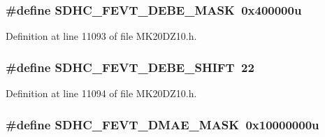 \subsubsection[{\texorpdfstring{S\+D\+H\+C\+\_\+\+F\+E\+V\+T\+\_\+\+D\+E\+B\+E\+\_\+\+M\+A\+SK}{SDHC_FEVT_DEBE_MASK}}]{\setlength{\rightskip}{0pt plus 5cm}\#define S\+D\+H\+C\+\_\+\+F\+E\+V\+T\+\_\+\+D\+E\+B\+E\+\_\+\+M\+A\+SK~0x400000u}\hypertarget{group___s_d_h_c___register___masks_gac409de67d8fb1f25c2d250922180f666}{}\label{group___s_d_h_c___register___masks_gac409de67d8fb1f25c2d250922180f666}


Definition at line 11093 of file M\+K20\+D\+Z10.\+h.

\subsubsection[{\texorpdfstring{S\+D\+H\+C\+\_\+\+F\+E\+V\+T\+\_\+\+D\+E\+B\+E\+\_\+\+S\+H\+I\+FT}{SDHC_FEVT_DEBE_SHIFT}}]{\setlength{\rightskip}{0pt plus 5cm}\#define S\+D\+H\+C\+\_\+\+F\+E\+V\+T\+\_\+\+D\+E\+B\+E\+\_\+\+S\+H\+I\+FT~22}\hypertarget{group___s_d_h_c___register___masks_ga2524f7345007e20b9788e9b83874c225}{}\label{group___s_d_h_c___register___masks_ga2524f7345007e20b9788e9b83874c225}


Definition at line 11094 of file M\+K20\+D\+Z10.\+h.

\subsubsection[{\texorpdfstring{S\+D\+H\+C\+\_\+\+F\+E\+V\+T\+\_\+\+D\+M\+A\+E\+\_\+\+M\+A\+SK}{SDHC_FEVT_DMAE_MASK}}]{\setlength{\rightskip}{0pt plus 5cm}\#define S\+D\+H\+C\+\_\+\+F\+E\+V\+T\+\_\+\+D\+M\+A\+E\+\_\+\+M\+A\+SK~0x10000000u}\hypertarget{group___s_d_h_c___register___masks_gad91681b40c16fc4d1fcefe155d3437cb}{}\label{group___s_d_h_c___register___masks_gad91681b40c16fc4d1fcefe155d3437cb}


